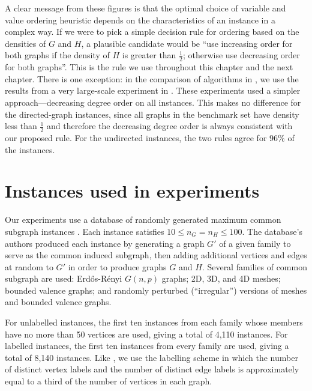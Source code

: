 A clear message from these figures is that the optimal choice of variable and
value ordering heuristic depends on the characteristics of an instance in a
complex way.  If we were to pick a simple decision rule for ordering based on
the densities of $G$ and $H$, a plausible candidate would be ``use increasing
order for both graphs if the density of $H$ is greater than $\frac{1}{2}$;
otherwise use decreasing order for both graphs''.  This is the rule we use
throughout this chapter and the next chapter.  There is one exception: in the
comparison of algorithms in , we use the
results from a very large-scale experiment in
\citet{DBLP:conf/ijcai/McCreeshPT17}.
These experiments used a simpler approach---decreasing
degree order on all instances.
This makes no difference for the directed-graph instances, since
all graphs in the benchmark set have density less than $\frac{1}{2}$
and therefore the decreasing degree order is always consistent with
our proposed rule.
For the undirected instances, the two rules agree for $96\%$ of the
instances.

\FloatBarrier

\section{Instances used in experiments}\label{sec:mcis-instances}

Our experiments use a database of randomly generated maximum common subgraph
instances \citep{DBLP:journals/prl/SantoFSV03,DBLP:journals/jgaa/ConteFV07}.
Each instance satisfies $10 \leq n_G = n_H \leq 100$.  The database's authors
produced each instance by generating a graph $G'$ of a given family to serve as
the common induced subgraph, then adding additional vertices and edges at
random to $G'$ in order to produce graphs $G$ and $H$. Several families of
common subgraph are used: Erd\H{o}s-Rényi $G(n,p)$ graphs; 2D, 3D, and 4D meshes;
bounded valence graphs; and randomly perturbed (``irregular'') versions of
meshes and bounded valence graphs.

For unlabelled instances, the
first ten instances from each family whose members have no more than 50
vertices are used, giving a total of 4,110 instances.  For labelled instances,
the first ten instances from every family are used, giving a total of 8,140
instances. Like \citet{DBLP:conf/cp/McCreeshNPS16}, we use the labelling scheme
in which the number of distinct vertex labels and the number of distinct edge
labels is approximately equal to a third of the number of vertices in each
graph.


